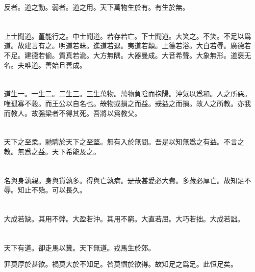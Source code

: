 \documentclass[a5paper]{ctexbook}
\newcommand{\bo}[1]{\textcolor[RGB]{0,255,255}{#1}}
\newcommand{\jian}[1]{\textcolor[RGB]{0,255,0}{#1}}
\def\del{\sout}
\begin{document}
    反者。道之動。弱者。道之用。天下萬物生於有。有生於無。

    \chapter{}

    上士聞道。\jian{堇}\jian{能}行之。中士聞道。若存若亡。下士聞道。大笑之。不笑。不足以爲道。故建言有之。明道若昧。進道若退。夷道若纇。上德若\bo{浴}。大白若辱。廣德若不足。建德若偷。質真若渝。大方無隅。大器\jian{曼}成。大音希聲。大象無形。道\bo{襃}无名。夫唯道。\bo{善始且善成}。

    \chapter{}

    道生一。一生二。二生三。三生萬物。萬物負陰而抱陽。沖氣以爲和。人之所惡。唯孤寡不穀。而王公\bo{以自名也}。\bo{\del{故}}物或損之而益。\bo{\del{或}}益之而損。\bo{故}人之所教。\bo{亦我而教人}。\bo{故}强梁者不得其死。吾將以爲教父。

    \chapter{}

    天下之至柔。馳騁\bo{於}天下之至堅。無有入\bo{於}無\bo{間}。吾是以知無爲之有益。不言之教。無爲之益。天下希\bo{能}及之。

    \chapter{}

    名與身孰親。身與貨孰多。得與亡孰病。\jian{\del{是故}}甚愛必大費。多藏必厚亡。\jian{故}知足不辱。知止不殆。可以長久。

    \chapter{}

    大成若缺。其用不弊。大盈若沖。其用不窮。大直若屈。大巧若拙。\jian{大成若詘}。

    \chapter{}

    天下有道。卻走馬以糞。天下無道。戎馬生於郊。

    \jian{罪莫厚於甚欲}。禍莫大於不知足。咎莫\bo{憯}於欲得。\jian{\del{故}}\jian{知足之爲足}。\jian{此}\bo{恒}足矣。
\end{document}
